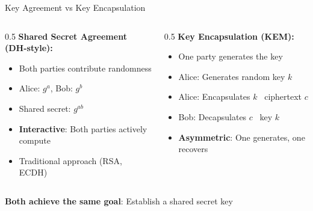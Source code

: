 \documentclass[aspectratio=169, lualatex]{beamer} %
\begin{document}
\begin{frame}{Key Agreement vs Key Encapsulation}
	\begin{columns}[c]
		\begin{column}{0.5\textwidth}
			\textbf{Shared Secret Agreement (DH-style):}
			\begin{itemize}
				\item Both parties contribute randomness
				\item Alice: $g^a$, Bob: $g^b$
				\item Shared secret: $g^{ab}$
				\item \textbf{Interactive}: Both parties actively compute
				\item Traditional approach (RSA, ECDH)
			\end{itemize}
		\end{column}
		\begin{column}{0.5\textwidth}
			\textbf{Key Encapsulation (KEM):}
			\begin{itemize}
				\item One party generates the key
				\item Alice: Generates random key $k$
				\item Alice: Encapsulates $k$ \rightarrow\ ciphertext $c$
				\item Bob: Decapsulates $c$ \rightarrow\ key $k$
				\item \textbf{Asymmetric}: One generates, one recovers
			\end{itemize}
		\end{column}
	\end{columns}
	\vspace{5mm}
	\begin{center}
		\textbf{Both achieve the same goal}: Establish a shared secret key
	\end{center}
\end{frame}
\end{document}
